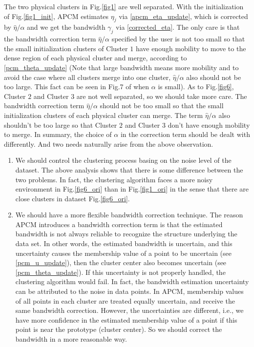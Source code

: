 \documentclass[journal,transmag]{IEEEtran}
\begin{document}
The two physical clusters in Fig.\ref{fig1} are well separated. With the initialization of Fig.\ref{fig1_init}, APCM estimates $\eta_j$ via \eqref{apcm_eta_update}, which is corrected by $\hat{\eta}/\alpha$ and we get the bandwidth $\gamma_j$ via \eqref{corrected_eta}. The only care is that the bandwidth correction term $\hat{\eta}/\alpha$ specified by the user is not too small so that the small initialization clusters of Cluster $1$ have enough mobility to move to the dense region of each physical cluster and  merge, according to \eqref{pcm_theta_update} (Note that large bandwidth means more mobility and to avoid the case where all clusters merge into one cluster, $\hat{\eta}/\alpha$ also should not be too large. This fact can be seen in Fig.7 of \cite{xenaki_novel_2016} when $\alpha$ is small).
As to Fig.\ref{fig6}, Cluster $2$ and Cluster $3$ are not well separated, so we should take more care. The bandwidth correction term $\hat{\eta}/\alpha$ should not be too small so that the small initialization clusters of each physical cluster can merge. The term $\hat{\eta}/\alpha$ also shouldn't be too large so that Cluster $2$ and Cluster $3$ don't have enough mobility to merge.
In summary, the choice of $\alpha$ in the correction term should be dealt with differently. And two needs naturally arise from the above observation.
\begin{enumerate}
\item We should control the clustering process basing on the noise level of the dataset. The above analysis shows that there is some difference between the two problems. In fact, the clustering algorithm faces a more noisy environment in Fig.\ref{fig6_ori} than in Fig.\ref{fig1_ori} in the sense that there are close clusters in dataset Fig.\ref{fig6_ori}.
\item We should have a more flexible bandwidth correction technique.
The reason APCM introduces a bandwidth correction term is that the estimated bandwidth is not always reliable to recognize the structure underlying the data set.
In other words, the estimated bandwidth is uncertain, and this uncertainty causes the membership value of a point to be uncertain (see \eqref{pcm_u_update}), then the cluster center also becomes uncertain (see \eqref{pcm_theta_update}). If this uncertainty is not properly handled, the clustering algorithm would fail.
In fact, the bandwidth estimation uncertainty can be attributed to the noise in data points.
In APCM, membership values of all points in each cluster are treated equally uncertain, and receive the same bandwidth correction.
However, the uncertainties are different, i.e., we have more confidence in the estimated membership value of a point if this point is near the prototype (cluster center).
So we should correct the bandwidth in a more reasonable way.
\end{enumerate}
\end{document}
